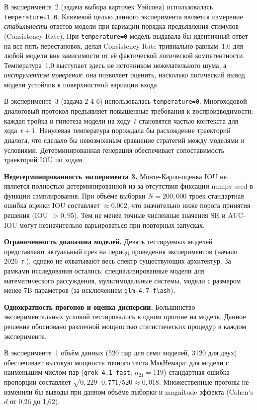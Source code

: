 В эксперименте~2 (задача выбора карточек Уэйсона) использовалась \texttt{temperature=1.0}. Ключевой целью данного эксперимента является измерение \textit{стабильности} ответов модели при вариации порядка предъявления стимулов (Consistency Rate). При \texttt{temperature=0} модель выдавала бы идентичный ответ на все пять перестановок, делая Consistency Rate тривиально равным~1{,}0 для любой модели вне зависимости от её фактической логической компетентности. Температура~1{,}0 выступает здесь не источником нежелательного шума, а \textit{инструментом измерения}: она позволяет оценить, насколько логический вывод модели устойчив к поверхностной вариации входа.

В эксперименте~3 (задача 2-4-6) использовалась \texttt{temperature=0}. Многоходовой диалоговый протокол предъявляет повышенные требования к воспроизводимости: каждая тройка и гипотеза модели на ходу~$t$ становятся частью контекста для хода~$t+1$. Ненулевая температура порождала бы расхождение траекторий диалога, что сделало бы невозможным сравнение стратегий между моделями и условиями. Детерминированная генерация обеспечивает сопоставимость траекторий IOU по ходам.

\textbf{Недетерминированность эксперимента 3.} Монте-Карло-оценка IOU не является полностью детерминированной из-за отсутствия фиксации numpy seed в функции сэмплирования. При объёме выборки $N = 200{,}000$ троек стандартная ошибка оценки IOU составляет $\approx$0{,}002, что значительно ниже порога принятия решения (IOU~$> 0{,}95$). Тем не менее точные численные значения SR и AUC-IOU могут незначительно варьироваться при повторных запусках.

\textbf{Ограниченность диапазона моделей.} Девять тестируемых моделей представляют актуальный срез на период проведения экспериментов (начало 2026~г.), однако не охватывают весь спектр существующих архитектур. За рамками исследования остались: специализированные модели для математического рассуждения, мультимодальные системы, модели с размером менее 7B параметров (за исключением \texttt{glm-4.7-flash}).

\textbf{Однократность прогонов и оценка дисперсии.} Большинство экспериментальных условий тестировались в одном прогоне на модель. Данное решение обосновано различной мощностью статистических процедур в каждом эксперименте.

В эксперименте~1 объём данных (520 пар для семи моделей, 3120 для двух) обеспечивает высокую мощность точного теста МакНемара: для модели с наименьшим числом пар (\texttt{grok-4.1-fast}, $n_{21} = 119$) стандартная ошибка пропорции составляет $\sqrt{0{,}229 \cdot 0{,}771 / 520} \approx 0{,}018$. Множественные прогоны не изменили бы выводы при данном объёме выборки и magnitude эффекта (Cohen's $d$ от 0{,}26 до 1{,}62).

